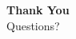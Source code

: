 \documentclass[aspectratio=169, 11pt]{beamer}
\begin{document}
\begin{frame}
    \centering
    \vspace{1.5cm}
    {\Huge \textbf{\textcolor{amritaMaroon}{Thank You}}} \\
    \vspace{0.5cm}
    {\large Questions?}
\end{frame}
\end{document}
